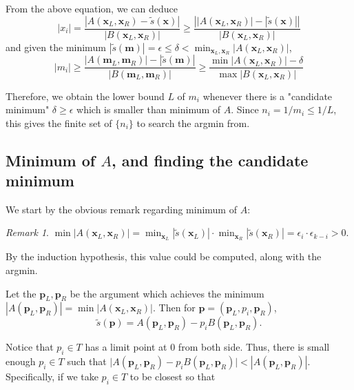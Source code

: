 \documentclass{article}
\theoremstyle{definition}
\theoremstyle{plain}
\theoremstyle{remark}
\newtheorem*{remark}{Remark}
\numberwithin{equation}{section}
\newcommand{\abs}[1]{\left\lvert{#1}\right\rvert}
\begin{document}
From the above equation, we can deduce
\[
  \abs{x_i} = \frac{\abs{A(\mathbf{x}_L, \mathbf{x}_R) - \tilde{s}(\mathbf{x})}}{\abs{B(\mathbf{x}_L, \mathbf{x}_R)}}
  \geq \frac{\abs{\abs{A(\mathbf{x}_L, \mathbf{x}_R)} - \abs{\tilde{s}(\mathbf{x})}}}{\abs{B(\mathbf{x}_L, \mathbf{x}_R)}}
\]
and given the minimum $\abs{\tilde{s}(\mathbf{m})} = \epsilon \leq \delta
< \min_{\mathbf{x}_L, \mathbf{x}_R} \abs{A(\mathbf{x}_L, \mathbf{x}_R)}$,
\begin{equation}\label{normal_key_condition}
  \abs{m_i}
  \geq \frac{\abs{A(\mathbf{m}_L, \mathbf{m}_R)} - \abs{\tilde{s}(\mathbf{m})}}{\abs{B(\mathbf{m}_L, \mathbf{m}_R)}}
  \geq \frac{\min \abs{A(\mathbf{x}_L, \mathbf{x}_R)} - \delta}{\max \abs{B(\mathbf{x}_L, \mathbf{x}_R)}}
\end{equation}

Therefore, we obtain the lower bound $L$ of $m_i$
whenever there is a "candidate minimum" $\delta \geq \epsilon$
which is smaller than minimum of $A$.
Since $n_i = 1 / m_i \leq 1 / L$, this gives the finite set of $\{ n_i \}$ to search the argmin from.

\subsection{Minimum of $A$, and finding the candidate minimum}

We start by the obvious remark regarding minimum of $A$:
\begin{remark}
  $\min \abs{A(\mathbf{x}_L, \mathbf{x}_R)}
  = \min_{\mathbf{x}_L} \abs{\tilde{s}(\mathbf{x}_L)} \cdot \min_{\mathbf{x}_R} \abs{\tilde{s}(\mathbf{x}_R)}
  = \epsilon_i \cdot \epsilon_{k-i} > 0$.
\end{remark}
By the induction hypothesis, this value could be computed, along with the argmin.

Let the $\mathbf{p}_L, \mathbf{p}_R$ be the argument
which achieves the minimum $\abs{A(\mathbf{p}_L, \mathbf{p}_R)} = \min \abs{A(\mathbf{x}_L, \mathbf{x}_R)}$.
Then for $\mathbf{p} = (\mathbf{p}_L, p_i, \mathbf{p}_R)$,
\begin{equation}\label{candidate-min}
  \tilde{s}(\mathbf{p}) = A(\mathbf{p}_L, \mathbf{p}_R) - p_i B(\mathbf{p}_L, \mathbf{p}_R).
\end{equation}

Notice that $p_i \in T$ has a limit point at $0$ from both side.
Thus, there is small enough $p_i \in T$
such that $\lvert A(\mathbf{p}_L, \mathbf{p}_R) - p_i B(\mathbf{p}_L, \mathbf{p}_R) \rvert
< \abs{A(\mathbf{p}_L, \mathbf{p}_R)}$.
Specifically, if we take $p_i \in T$ to be closest so that
\end{document}
